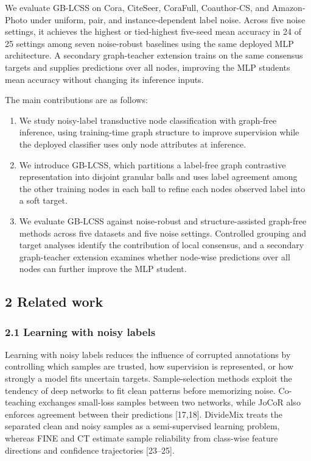We evaluate GB-LCSS on Cora, CiteSeer, CoraFull, Coauthor-CS, and Amazon-Photo under uniform, pair, and instance-dependent label noise. Across five noise settings, it achieves the highest or tied-highest five-seed mean accuracy in 24 of 25 settings among seven noise-robust baselines using the same deployed MLP architecture. A secondary graph-teacher extension trains on the same consensus targets and supplies predictions over all nodes, improving the MLP student\textquotesingle s mean accuracy without changing its inference inputs.

The main contributions are as follows:

\begin{enumerate}
\def\labelenumi{\arabic{enumi}.}
\tightlist
\item
  We study noisy-label transductive node classification with graph-free inference, using training-time graph structure to improve supervision while the deployed classifier uses only node attributes at inference.
\item
  We introduce GB-LCSS, which partitions a label-free graph contrastive representation into disjoint granular balls and uses label agreement among the other training nodes in each ball to refine each node\textquotesingle s observed label into a soft target.
\item
  We evaluate GB-LCSS against noise-robust and structure-assisted graph-free methods across five datasets and five noise settings. Controlled grouping and target analyses identify the contribution of local consensus, and a secondary graph-teacher extension examines whether node-wise predictions over all nodes can further improve the MLP student.
\end{enumerate}

\subsection{2 Related work}\label{related-work}

\subsubsection{2.1 Learning with noisy labels}\label{learning-with-noisy-labels}

Learning with noisy labels reduces the influence of corrupted annotations by controlling which samples are trusted, how supervision is represented, or how strongly a model fits uncertain targets. Sample-selection methods exploit the tendency of deep networks to fit clean patterns before memorizing noise. Co-teaching exchanges small-loss samples between two networks, while JoCoR also enforces agreement between their predictions {[}17,18{]}. DivideMix treats the separated clean and noisy samples as a semi-supervised learning problem, whereas FINE and CT estimate sample reliability from class-wise feature directions and confidence trajectories {[}23--25{]}.

